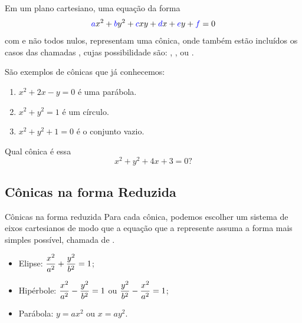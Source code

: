 \begin{frame}[label=conicas]

Em um plano cartesiano, uma equação da forma
\begin{equation*}
{\color{blue}a}{x^2}+{\color{blue}b}{y^2}
+{\color{blue}c}{xy}+{\color{blue}d}{x}
+{\color{blue}e}{y}+{\color{blue}f}=0
\end{equation*}
com  e  não todos nulos, representam uma cônica, onde também 
estão incluídos os casos das chamadas , cujas 
possibilidade são: , ,  ou .

\begin{exe}
São exemplos de cônicas que já conhecemos:
\begin{enumerate}
\item $x^2+2x-y=0$ é uma parábola.
\item $x^2+y^2=1$ é um círculo.
\item $x^2+y^2+1=0$ é o conjunto vazio.
\end{enumerate}
Qual cônica é essa
\[x^2+y^2+4x+3=0?\]
\end{exe}

\end{frame}

\subsection*{Cônicas na forma Reduzida}
\begin{frame}[label=conicas]{Cônicas na forma reduzida}
Para cada cônica, podemos escolher um sistema de eixos cartesianos de modo que a equação que a represente assuma a forma mais simples possível, chamada de .

\begin{itemize}
\item Elipse: $\displaystyle\frac{x^2}{a^2}+\frac{y^2}{b^2}=1$;

\item Hipérbole: $\displaystyle\frac{x^2}{a^2}-\frac{y^2}{b^2}=1$ ou $\displaystyle\frac{y^2}{b^2}-\frac{x^2}{a^2}=1$;

\item Parábola: $y=ax^2$ ou $x=ay^2$.
\end{itemize}
\end{frame}


